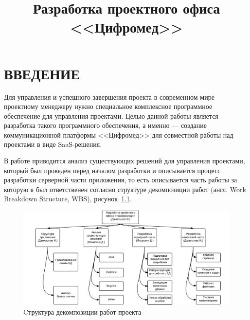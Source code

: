 \documentclass[14pt, a4paper]{extreport}
\title{Разработка проектного офиса <<Цифромед>>}
\date{}
\begin{document}
\pagestyle{plain}

\renewcommand\abstractname{\MakeTextUppercase{Реферат}}

\newpage
\vspace*{-25mm}
\tableofcontents
\newpage


\chapter{\MakeTextUppercase{Введение}}
Для управления и успешного завершения проекта в современном мире проектному
менеджеру нужно специальное комплексное программное обеспечение для управления
проектами. Целью данной работы является разработка такого программного обеспечения,
а именно --- создание коммуникационной платформы <<Цифромед>> для совместной работы
над проектами в виде SaaS-решения.

В работе приводится анализ существующих решений для управления проектами, который
был проведен перед началом разработки и описывается процесс разработки серверной
части приложения, то есть описывается часть работы за которую я был ответственен согласно
структуре декомпозиции работ (англ. Work Breakdown Structure, WBS), рисунок~\ref{fig:wbo}.

\begin{figure}[!htb]
  \centering
    \includegraphics[scale=0.25]{../shared_images/wbs.png}
    \caption{Cтруктура декомпозиции работ проекта}
    \label{fig:wbo}
\end{figure}
\end{document}
